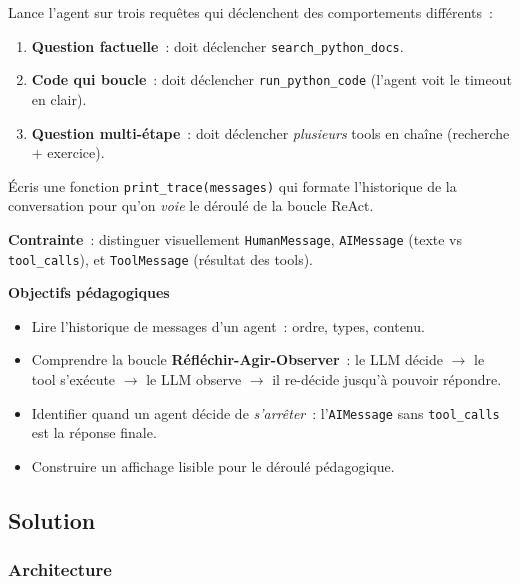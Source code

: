 \documentclass[11pt,a4paper]{article}
\begin{document}
\begin{tcolorbox}[title=Exercice 3. Trois démos contrastées pour voir la boucle ReAct]
Lance l'agent sur trois requêtes qui déclenchent des comportements
différents~:

\begin{enumerate}[leftmargin=*]
  \item \textbf{Question factuelle}~: doit déclencher
        \texttt{search\_python\_docs}.
  \item \textbf{Code qui boucle}~: doit déclencher
        \texttt{run\_python\_code} (l'agent voit le timeout en clair).
  \item \textbf{Question multi-étape}~: doit déclencher
        \emph{plusieurs} tools en chaîne (recherche + exercice).
\end{enumerate}

Écris une fonction \texttt{print\_trace(messages)} qui formate
l'historique de la conversation pour qu'on \emph{voie} le déroulé de
la boucle ReAct.

\textbf{Contrainte}~: distinguer visuellement \texttt{HumanMessage},
\texttt{AIMessage} (texte vs \texttt{tool\_calls}), et
\texttt{ToolMessage} (résultat des tools).

\bigskip
\noindent\textbf{Objectifs pédagogiques}
\begin{itemize}[leftmargin=*]
  \item Lire l'historique de messages d'un agent~: ordre, types, contenu.
  \item Comprendre la boucle \textbf{Réfléchir-Agir-Observer}~: le LLM
        décide $\to$ le tool s'exécute $\to$ le LLM observe $\to$ il
        re-décide jusqu'à pouvoir répondre.
  \item Identifier quand un agent décide de \emph{s'arrêter}~:
        l'\texttt{AIMessage} sans \texttt{tool\_calls} est la réponse
        finale.
  \item Construire un affichage lisible pour le déroulé pédagogique.
\end{itemize}
\end{tcolorbox}

\subsection{Solution}

\subsubsection{Architecture}
\end{document}

